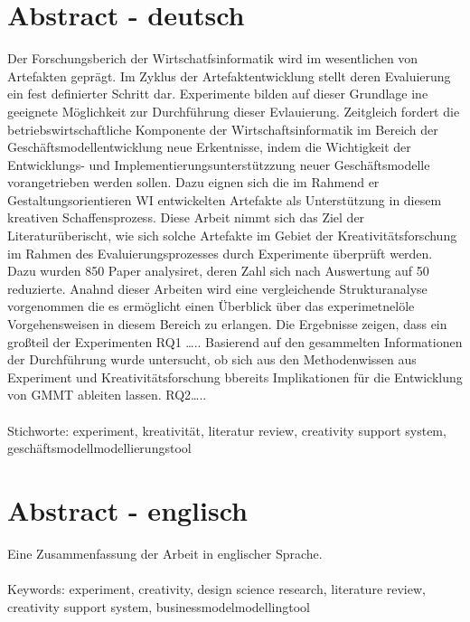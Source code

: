 \section*{Abstract - deutsch}
Der Forschungsberich der Wirtschatfsinformatik wird im wesentlichen von Artefakten geprägt. Im Zyklus der Artefaktentwicklung stellt deren Evaluierung ein fest definierter Schritt dar. Experimente bilden auf dieser Grundlage ine geeignete Möglichkeit zur Durchführung dieser Evlauierung.  Zeitgleich fordert die betriebswirtschaftliche Komponente der Wirtschaftsinformatik im Bereich der Geschäftsmodellentwicklung neue Erkentnisse, indem die Wichtigkeit der Entwicklungs- und Implementierungsunterstützzung neuer Geschäftsmodelle  vorangetrieben werden sollen. Dazu eignen sich die im Rahmend er Gestaltungsorientieren WI entwickelten Artefakte als Unterstützung in diesem kreativen Schaffensprozess.  Diese Arbeit nimmt sich das Ziel der Literaturüberischt, wie sich solche Artefakte im Gebiet der Kreativitätsforschung im Rahmen des Evaluierungsprozesses durch Experimente überprüft werden. Dazu wurden 850 Paper analysiret, deren Zahl sich nach Auswertung auf 50 reduzierte. Anahnd dieser Arbeiten wird eine vergleichende Strukturanalyse vorgenommen die es ermöglicht einen Überblick über das experimetnelöle Vorgehensweisen in diesem Bereich zu erlangen. Die Ergebnisse zeigen, dass ein großteil der Experimenten RQ1 ….. Basierend auf den gesammelten Informationen der Durchführung wurde untersucht, ob sich aus den Methodenwissen aus Experiment und Kreativitätsforschung bbereits Implikationen für die Entwicklung von GMMT ableiten lassen. RQ2…..  \\\\
Stichworte: experiment, kreativität, literatur review, creativity support system, geschäftsmodellmodellierungstool

\section*{Abstract - englisch}
Eine Zusammenfassung der Arbeit in englischer Sprache.
\\\\
Keywords: experiment, creativity, design science research, literature review, creativity support system, businessmodelmodellingtool 
\\\\\\



